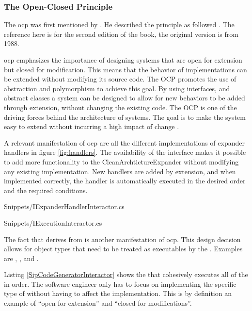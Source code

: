 \subsubsection{The Open-Closed Principle} \label{subsubsec:ocp}

The \gls{ocp} was first mentioned by . He described
the principle as followed \parencite[79]{meyer_object-oriented_1997}. The reference here
is for the second edition of the book, the original version is from 1988.


\gls{ocp} emphasizes the importance of designing systems that are open for extension but
closed for modification. This means that the behavior of implementations can be extended
without modifying its source code. The OCP promotes the use of abstraction and
polymorphism to achieve this goal. By using interfaces, and abstract classes a system can
be designed to allow for new behaviors to be added through extension, without changing the
existing code. The OCP is one of the driving forces	behind the architecture	of systems.
The goal is	to make	the	system easy	to extend without incurring a high impact of change
\parencite[94]{robert_c_martin_clean_2018}.

A relevant manifestation of \gls{ocp} are all the different implementations of expander
handlers in figure \ref{fig:handlers}. The availability of the
 interface makes it possible to add more
functionality to the CleanArchtictureExpander without modifying any existing
implementation. New handlers are added by extension, and when implemented correctly, the
handler is automatically executed in the desired order and the required conditions.


    {Snippets/IExpanderHandlerInteractor.cs}


    {Snippets/IExecutionInteractor.cs}

The fact that  derives from
 is another manifestation of \gls{ocp}. This
design decision allows for object types that need to be treated as executables by the
. Examples are
,
,
 and
. 

Listing \ref{SipCodeGeneratorInteractor} shows the
 that cohesively executes all of the
 in order. The software engineer only has to focus on
implementing the specific type of  without having to
affect the implementation. This is by definition an example of \enquote{open for
extension} and \enquote{closed for modifications}.